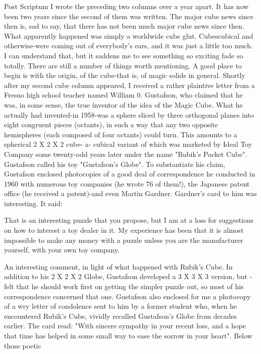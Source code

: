 Post Scriptum
        I wrote the preceding two columns over a year apart. It has now been two
years since the second of them was written. The major cube news since then is, sad
to say, that there has not been much major cube news since then. What apparently
happened was simply a worldwide cube glut. Cubescubical and otherwise-were
coming out of everybody's ears, and it was just a little too much. I can understand
that, but it saddens me to see something so exciting fade so totally.
        There are still a number of things worth mentioning. A good place to begin
is with the origin, of the cube-that is, of magic solids in general. Shortly after my
second cube column appeared, I received a rather plaintive letter from a Fresno
high school teacher named William 0. Gustafson, who claimed that he was, in
some sense, the true inventor of the idea of the Magic Cube. What he actually had
invented-in 1958-was a sphere sliced by three orthogonal planes into eight
congruent pieces (octants), in such a way that any two opposite hemispheres (each
composed of four octants) could turn. This amounts to a spherical 2 X 2 X 2 cube-
a- cubical variant of which was marketed by Ideal Toy Company some twenty-odd
years later under the name "Rubik's Pocket Cube". Gustafson called his toy
"Gustafson's Globe".
        To substantiate his claim, Gustafson enclosed photocopies of a good deal of
correspondence he conducted in 1960 with numerous toy companies (he wrote 76
of them!), the Japanese patent office (he received a patent)-and even Martin
Gardner. Gardner's card to him was interesting. It said:

  That is an interesting puzzle that you propose, but I am at a loss for suggestions
  on how to interest a toy dealer in it. My experience has been that it is almost
  impossible to make any money with a puzzle unless you are the manufacturer
  yourself, with your own toy company.

An interesting comment, in light of what happened with Rubik's Cube. In addition
to his 2 X 2 X 2 Globe, Gustafson developed a 3 X 3 X 3 version, but - felt that he
should work first on getting the simpler puzzle out, so most of his correspondence
concerned that one.
        Gustafson also enclosed for me a photocopy of a wry letter of condolence
sent to him by a former student who, when he encountered Rubik's Cube, vividly
recalled Gustafson's Globe from decades earlier. The card read: "With sincere
sympathy in your recent loss, and a hope that time has helped in some small way to
ease the sorrow in your heart". Below those poetic




